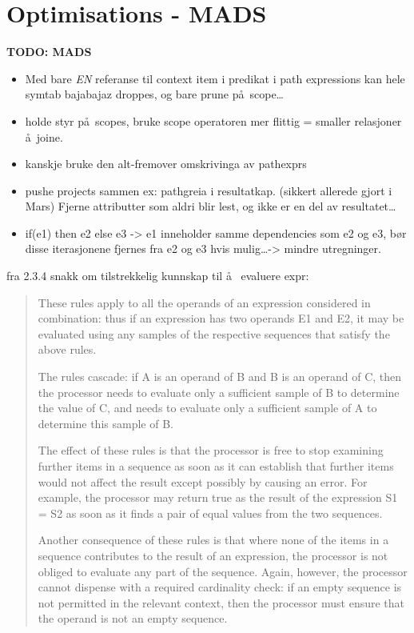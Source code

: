 \section{Optimisations - {MADS}}
\label{sect:disc:optimisations}
\textbf{\LARGE TODO: {MADS}}
\begin{itemize}
  \item Med bare \emph{EN} referanse til context item i predikat i path expressions kan hele symtab bajabajaz
  droppes, og bare prune p\aa~scope\ldots
  \item holde styr p\aa~scopes, bruke scope operatoren mer flittig = smaller relasjoner \aa~joine.
  \item kanskje bruke den alt-fremover omskrivinga av pathexprs
  \item pushe projects sammen ex: pathgreia i resultatkap. (sikkert allerede gjort i Mars) Fjerne attributter som
  aldri blir lest, og ikke er en del av resultatet\ldots
  \item if(e1) then e2 else e3 -> e1 inneholder samme dependencies som e2 og e3, b\o r disse iterasjonene fjernes
  fra e2 og e3 hvis mulig\ldots -> mindre utregninger.
\end{itemize}

fra 2.3.4 snakk om tilstrekkelig kunnskap til \aa~ evaluere expr:
\begin{quote}
These rules apply to all the operands of an expression considered in combination: thus if an expression has two
operands E1 and E2, it may be evaluated using any samples of the respective sequences that satisfy the above rules.

The rules cascade: if A is an operand of B and B is an operand of C, then the processor needs to evaluate only a
sufficient sample of B to determine the value of C, and needs to evaluate only a sufficient sample of A to
determine this sample of B.

The effect of these rules is that the processor is free to stop examining further items in a sequence as soon as
it can establish that further items would not affect the result except possibly by causing an error. For example,
the processor may return true as the result of the expression S1 = S2 as soon as it finds a pair of equal values
from the two sequences.

Another consequence of these rules is that where none of the items in a sequence contributes to the result of an
expression, the processor is not obliged to evaluate any part of the sequence. Again, however, the processor
cannot dispense with a required cardinality check: if an empty sequence is not permitted in the relevant context,
then the processor must ensure that the operand is not an empty sequence.
\end{quote}

